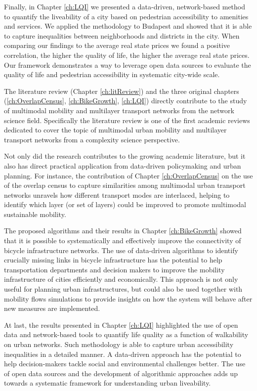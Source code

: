 Finally, in Chapter \ref{ch:LQI} we presented a data-driven, network-based method to quantify the liveability of a city based on pedestrian accessibility to amenities and services. We applied the methodology to Budapest and showed that it is able to capture inequalities between neighborhoods and districts in the city. When comparing our findings to the average real state prices we found a positive correlation, the higher the quality of life, the higher the average real state prices.    Our framework demonstrates a way to leverage open data sources to evaluate the quality of life and pedestrian accessibility in systematic city-wide scale.

The literature review (Chapter \ref{ch:litReview}) and the three original chapters (\ref{ch:OverlapCensus}, \ref{ch:BikeGrowth}, \ref{ch:LQI}) directly contribute to the study of multimodal mobility and multilayer transport networks from the network science field. Specifically the literature review is one of the first academic reviews dedicated to cover the topic of multimodal urban mobility and multilayer transport networks from a complexity science perspective.
 
Not only did the research contributes to the growing academic literature, but it also has direct practical application from data-driven policymaking and urban planning. For instance, the contribution of Chapter \ref{ch:OverlapCensus} on the use of the overlap census to capture similarities among multimodal urban transport networks unravels how different transport modes are interlaced, helping to identify which layer (or set of layers) could be improved to promote multimodal sustainable mobility.

The proposed algorithms and their results in Chapter \ref{ch:BikeGrowth} showed that it is possible to systematically and effectively improve the connectivity of bicycle infrastructure networks. The use of data-driven algorithms to identify crucially missing links in bicycle infrastructure has the potential to help transportation departments and decision makers to improve the mobility infrastructure of cities efficiently and economically. This approach is not only useful for planning urban infrastructures, but could also be used together with  mobility flows simulations to provide insights on how the system will behave after new measures are implemented.

At last, the results presented in Chapter \ref{ch:LQI} highlighted the use of open data and network-based tools to quantify life quality as a function of walkability on urban networks. Such methodology is able to capture urban accessibility inequalities in a detailed manner. A data-driven approach has the potential to help decision-makers tackle social and environmental challenges better. The use of open data sources and the development of algorithmic approaches adds up towards a systematic framework for understanding urban liveability.


